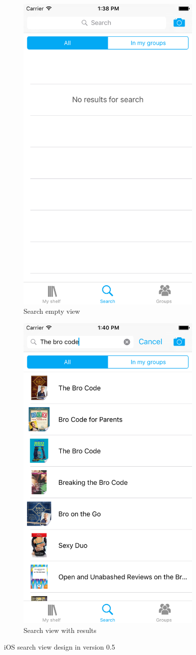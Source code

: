 \begin{description}
\begin{figure}
\centering
\begin{subfigure}{.5\textwidth}
  \centering
  \includegraphics[width=.4\textwidth]{figs/v05/ios-search-view.png}
  \caption{Search empty view}
  \label{fig:ios-search-view-empty-5}
\end{subfigure}%
\begin{subfigure}{.5\textwidth}
  \centering
  \includegraphics[width=.4\textwidth]{figs/v05/ios-search-results.png}
  \caption{Search view with results}
  \label{fig:ios-search-view-results-5}
\end{subfigure}
\caption{iOS search view design in version 0.5}
\label{fig:ios-search-view-5}
\end{figure}


\end{description}
